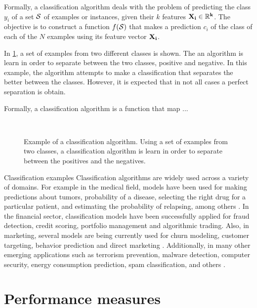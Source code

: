 Formally, a classification algorithm deals with the problem	of predicting the class $y_i$ of a 
set $\cal S$ of examples or instances, given their $k$ features \mbox{$\bf{X}_i \in 
\mathbb{R}^k$}. The objective is to construct a function $f(\cal{S})$ that makes a prediction 
$c_i$ of the class of each of the $N$ examples using its feature vector $\bf{X}_i$.
\label{ntn:ch2:1}

In \figurename{ \ref{fig:ch2:1}}, a set of examples from two different classes is shown. The an 
algorithm is learn in order to separate between the two classes, positive and negative. In this 
example, the algorithm attempts to make a classification that separates the better between the 
classes. However, it is expected that in not all cases a perfect separation is obtain. 

Formally, a classification algorithm is a function that map ... 

\begin{figure}[!t]
\centering
{}
\\
\caption{Example of a classification algorithm. Using a set of examples from two classes, a 
	classification algorithm is learn in order to separate between the positives and the negatives. }
\label{fig:ch2:1}
\end{figure} 

	
\begin{remark}{Classification examples}
Classification algorithms are widely used across a variety of domains. For example in the 
medical field, models have been used for making predictions about tumors, probability 
of a disease, selecting the right drug for a particular patient, and estimating the probability of 
relapsing, among others \citep{Herland2014}. In the financial sector, classification models have 
been successfully applied for fraud detection, credit scoring, portfolio management and algorithmic 
trading. Also, in marketing, several models are being currently used for churn modeling, customer 
targeting, behavior prediction and direct marketing \citep{Baesens2014}. Additionally, in many 
other emerging applications such as terrorism prevention, malware detection, computer security, 
energy consumption prediction, spam classification, and others \citep{Kriegel2007}.
\end{remark}

\section{Performance measures}

